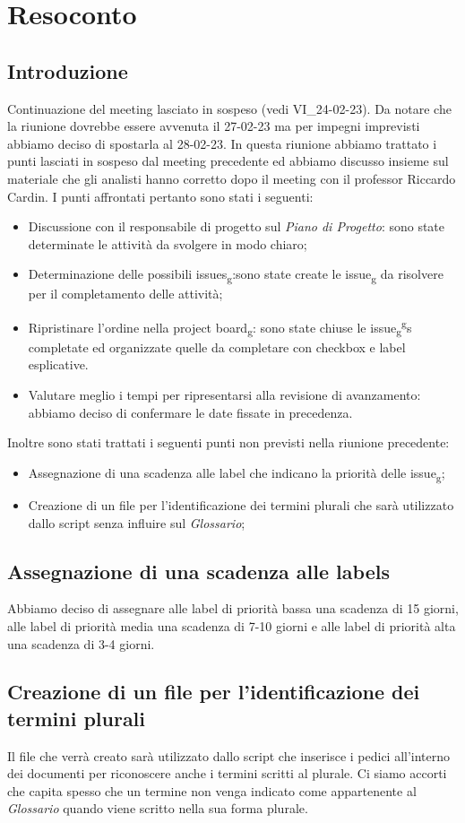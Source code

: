 \section{Resoconto}
\subsection{Introduzione}
Continuazione del meeting lasciato in sospeso (vedi VI\_24-02-23).
Da notare che la riunione dovrebbe essere avvenuta il 27-02-23 ma per impegni imprevisti abbiamo deciso di spostarla al 28-02-23.
In questa riunione abbiamo trattato i punti lasciati in sospeso dal meeting precedente ed abbiamo discusso insieme sul materiale che
gli analisti hanno corretto dopo il meeting con il professor Riccardo Cardin.
I punti affrontati pertanto sono stati i seguenti:
\begin{itemize}
    \item Discussione con il responsabile di progetto sul \textit{Piano di Progetto}: sono state determinate le attività da svolgere in modo chiaro;
    \item Determinazione delle possibili issues\textsubscript{g}:sono state create le issue\textsubscript{g} da risolvere per il completamento delle attività;
    \item Ripristinare l'ordine nella project board\textsubscript{g}: sono state chiuse le issue\textsubscript{g}\textsuperscript{g}s completate ed organizzate quelle da completare con checkbox e label esplicative.
    \item Valutare meglio i tempi per ripresentarsi alla revisione di avanzamento: abbiamo deciso di confermare le date fissate in precedenza.
    \end{itemize}
Inoltre sono stati trattati i seguenti punti non previsti nella riunione precedente:
\begin{itemize}
\item Assegnazione di una scadenza alle label che indicano la priorità delle issue\textsubscript{g};
\item Creazione di un file per l'identificazione dei termini plurali che sarà utilizzato dallo script senza influire sul \textit{Glossario};
\end{itemize}
\subsection{Assegnazione di una scadenza alle labels}
Abbiamo deciso di assegnare alle label di priorità bassa una scadenza di 15 giorni, alle label di priorità media una scadenza di 7-10 giorni e alle 
label di priorità alta una scadenza di 3-4 giorni.
\subsection{Creazione di un file per l'identificazione dei termini plurali}
Il file che verrà creato sarà utilizzato dallo script che inserisce i pedici all'interno dei documenti per riconoscere anche i termini scritti al 
plurale. Ci siamo accorti che capita spesso che un termine non venga indicato come appartenente al \textit{Glossario} quando viene scritto nella 
sua forma plurale.

